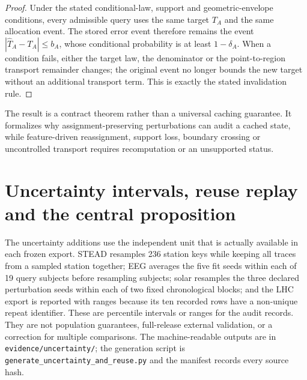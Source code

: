 \documentclass[11pt,a4paper]{article}
\numberwithin{equation}{section}
\theoremstyle{definition}\newtheorem{definition}[theorem]{Definition}
\theoremstyle{remark}\newtheorem{remark}[theorem]{Remark}
\begin{document}
\begin{proof}
Under the stated conditional-law, support and geometric-envelope conditions, every admissible query uses the same target $T_A$ and the same allocation event. The stored error event therefore remains the event $|\widehat T_A-T_A|\leq b_A$, whose conditional probability is at least $1-\delta_A$. When a condition fails, either the target law, the denominator or the point-to-region transport remainder changes; the original event no longer bounds the new target without an additional transport term. This is exactly the stated invalidation rule.\end{proof}

The result is a contract theorem rather than a universal caching guarantee. It formalizes why assignment-preserving perturbations can audit a cached state, while feature-driven reassignment, support loss, boundary crossing or uncontrolled transport requires recomputation or an unsupported status.

\section{Uncertainty intervals, reuse replay and the central proposition}
\label{sec:uncertainty}
The uncertainty additions use the independent unit that is actually available in each frozen export. STEAD resamples 236 station keys while keeping all traces from a sampled station together; EEG averages the five fit seeds within each of 19 query subjects before resampling subjects; solar resamples the three declared perturbation seeds within each of two fixed chronological blocks; and the LHC export is reported with ranges because its ten recorded rows have a non-unique repeat identifier. These are percentile intervals or ranges for the audit records. They are not population guarantees, full-release external validation, or a correction for multiple comparisons. The machine-readable outputs are in \texttt{evidence/uncertainty/}; the generation script is \texttt{generate\_uncertainty\_and\_reuse.py} and the manifest records every source hash.
\end{document}
